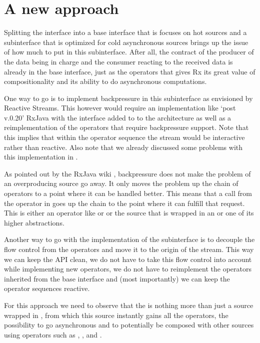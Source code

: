 \section{A new approach}
Splitting the \obs interface into a base interface that is focuses on hot sources and a subinterface that is optimized for cold asynchronous sources brings up the issue of how much to put in this subinterface. After all, the contract of the producer of the data being in charge and the consumer reacting to the received data is already in the base interface, just as the operators that gives Rx its great value of compositionality and its ability to do asynchronous computations.

One way to go is to implement backpressure in this subinterface as envisioned by Reactive Streams. This however would require an implementation like `post v.0.20' RxJava with the  interface added to to the architecture as well as a reimplementation of the operators that require backpressure support. Note that this implies that within the operator sequence the stream would be interactive rather than reactive. Also note that we already discussed some problems with this implementation in .

As pointed out by the RxJava wiki \cite{RxJava-Wiki-Backpressure}, backpressure does not make the problem of an overproducing source go away. It only moves the problem up the chain of operators to a point where it can be handled better. This means that a  call from the  operator in  goes up the chain to the point where it can fulfill that request. This is either an operator like  or  or the source that is wrapped in an  or one of its higher abstractions.

Another way to go with the implementation of the subinterface is to decouple the flow control from the operators and move it to the origin of the stream. This way we can keep the API clean, we do not have to take this flow control into account while implementing new operators, we do not have to reimplement the operators inherited from the base interface and (most importantly) we can keep the operator sequences reactive.

For this approach we need to observe that the \obs is nothing more than just a source wrapped in , from which this source instantly gains all the operators, the possibility to go asynchronous and to potentially be composed with other sources using operators such as , ,  and .

